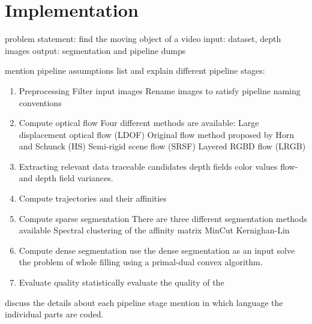 \chapter{Implementation}

problem statement: find the moving object of a video
input: dataset, depth images
output: segmentation and pipeline dumps

mention pipeline assumptions
list and explain different pipeline stages:

\begin{enumerate}
\item Preprocessing
	\subitem Filter input images
	\subitem Rename images to satisfy pipeline naming conventions 
\item Compute optical flow
	\subitem Four different methods are available:
	\subitem Large displacement optical flow (LDOF)
	\subitem Original flow method proposed by Horn and Schunck (HS)
	\subitem Semi-rigid scene flow (SRSF)
	\subitem Layered RGBD flow (LRGB)
\item Extracting relevant data
	\subitem traceable candidates
	\subitem depth fields
	\subitem color values
	\subitem flow-and depth field variances.
\item Compute trajectories and their affinities
\item Compute sparse segmentation
	\subitem There are three different segmentation methods available
	\subitem Spectral clustering of the affinity matrix
	\subitem MinCut
	\subitem Kernighan-Lin 
\item Compute dense segmentation
	\subitem use the dense segmentation as an input solve the problem of whole filling using a primal-dual convex algorithm. 
\item Evaluate quality
	\subitem statistically evaluate the quality of the  
\end{enumerate}

discuss the details about each pipeline stage
mention in which language the individual parts are coded.
